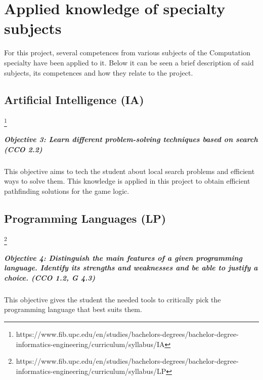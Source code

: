 \chapter{Applied knowledge of specialty subjects}

For this project, several competences from various subjects of the Computation
specialty have been applied to it. Below it can be seen a brief description
of said subjects, its competences and how they relate to the project.

\section {Artificial Intelligence (IA)}

\footnote{https://www.fib.upc.edu/en/studies/bachelors-degrees/bachelor-degree-informatics-engineering/curriculum/syllabus/IA}

\paragraph{Objective 3: Learn different problem-solving techniques based on search (CCO 2.2)} 
This objective aims to tech the student about local search problems and efficient ways to solve them.
This knowledge is applied in this project to obtain efficient pathfinding solutions
for the game logic.

\section{Programming Languages (LP)}

\footnote{https://www.fib.upc.edu/en/studies/bachelors-degrees/bachelor-degree-informatics-engineering/curriculum/syllabus/LP}

\paragraph{Objective 4: Distinguish the main features of a given programming language. Identify its strengths and weaknesses and be able to justify a choice. (CCO 1.2, G 4.3)} 
This objective gives the student the needed tools to critically pick the programming language that best suits them.

